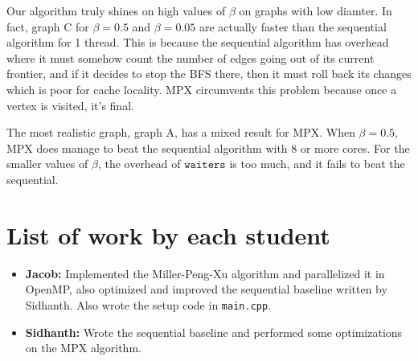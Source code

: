\documentclass[11pt]{scrartcl}
\theoremstyle{plain}
\theoremstyle{definition}
\theoremstyle{remark}
\newcommand{\waiters}{\texttt{waiters}}
\begin{document}
Our algorithm truly shines on high values of $\beta$ on graphs with low diamter. In fact, graph C for $\beta=0.5$ and $\beta=0.05$ are actually faster than the sequential algorithm for 1 thread. This is because the sequential algorithm has overhead where it must somehow count the number of edges going out of its current frontier, and if it decides to stop the BFS there, then it must roll back its changes which is poor for cache locality. MPX circumvents this problem because once a vertex is visited, it's final.

\par
The most realistic graph, graph A, has a mixed result for MPX. When $\beta = 0.5$, MPX does manage to beat the sequential algorithm with 8 or more cores. For the smaller values of $\beta$, the overhead of $\waiters$ is too much, and it fails to beat the sequential.
 

\section{List of work by each student}
\begin{itemize}
\item \textbf{Jacob:} Implemented the Miller-Peng-Xu
algorithm and parallelized it in OpenMP, also optimized
and improved the sequential baseline written by Sidhanth.
Also wrote the setup code in \texttt{main.cpp}.

\item \textbf{Sidhanth:} Wrote the sequential baseline and
performed some optimizations on the MPX algorithm.

\end{itemize}



\end{document}

